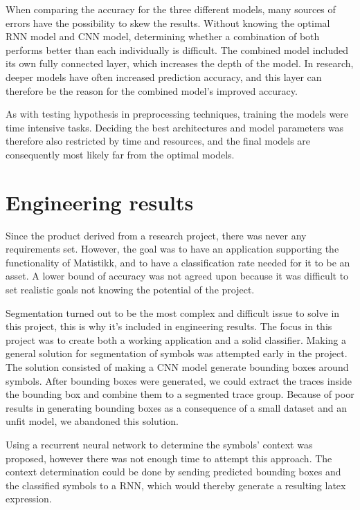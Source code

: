 When comparing the accuracy for the three different models, many sources of errors have the possibility to skew the results. Without knowing the optimal RNN model and CNN model, determining whether a combination of both performs better than each individually is difficult. The combined model included its own fully connected layer, which increases the depth of the model. In research, deeper models have often increased prediction accuracy, and this layer can therefore be the reason for the combined model's improved accuracy.

As with testing hypothesis in preprocessing techniques, training the models were time intensive tasks. Deciding the best architectures and model parameters was therefore also restricted by time and resources, and the final models are consequently most likely far from the optimal models.


\section{Engineering results}
\label{engineering_results}


Since the product derived from a research project, there was never any requirements set. However, the goal was to have an application supporting the functionality of Matistikk, and to have a classification rate needed for it to be an asset. A lower bound of accuracy was not agreed upon because it was difficult to set realistic goals not knowing the potential of the project. 

Segmentation turned out to be the most complex and difficult issue to solve in this project, this is why it's included in engineering results. The focus in this project was to create both a working application and a solid classifier. Making a general solution for segmentation of symbols was attempted early in the project. The solution consisted of making a CNN model generate bounding boxes around symbols. After bounding boxes were generated, we could extract the traces inside the bounding box and combine them to a segmented trace group. Because of poor results in generating bounding boxes as a consequence of a small dataset and an unfit model, we abandoned this solution.

Using a recurrent neural network to determine the symbols' context was proposed, however there was not enough time to attempt this approach. The context determination could be done by sending predicted bounding boxes and the classified symbols to a RNN, which would thereby generate a resulting latex expression. 

